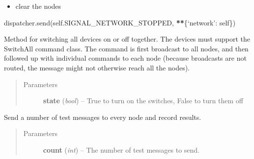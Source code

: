 \documentclass[letterpaper,10pt,english]{sphinxmanual}
\begin{document}
\begin{fulllineitems}
\begin{fulllineitems}
\begin{description}
\begin{itemize}
\item {} 
clear the nodes

\end{itemize}

\end{description}

dispatcher.send(self.SIGNAL\_NETWORK\_STOPPED, {\color{red}\bfseries{}**}\{`network': self\})

\end{fulllineitems}


\begin{fulllineitems}
\label{network:openzwave.network.ZWaveNetwork.switch_all}
Method for switching all devices on or off together.  The devices must support
the SwitchAll command class.  The command is first broadcast to all nodes, and
then followed up with individual commands to each node (because broadcasts are
not routed, the message might not otherwise reach all the nodes).
\begin{quote}\begin{description}
\item[{Parameters}] \leavevmode
\textbf{state} (\emph{bool}) -- True to turn on the switches, False to turn them off

\end{description}\end{quote}

\end{fulllineitems}


\begin{fulllineitems}
\label{network:openzwave.network.ZWaveNetwork.test}
Send a number of test messages to every node and record results.
\begin{quote}\begin{description}
\item[{Parameters}] \leavevmode
\textbf{count} (\emph{int}) -- The number of test messages to send.

\end{description}\end{quote}

\end{fulllineitems}



\end{fulllineitems}
\end{document}
